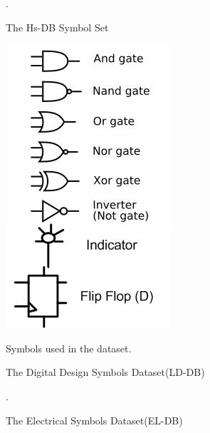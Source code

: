 \documentclass[preprint,10pt,5p,twocolumn]{elsarticle}
\begin{document}
\begin{figure}
\centering 
\label{fig:symbolSet}
		\caption{The Hs-DB Symbol Set}.
\end{figure}
\begin{figure}
\centering 
\label{fig:LogicsymbolSet}
 
		\includegraphics[scale=0.5]{images/logicSet.jpg}	 
		\caption{The Digital Design Symbols Dataset(LD-DB)} Symbols used in the dataset.
\end{figure}
\begin{figure}
\centering 
\label{fig:ELsymbolSet}
		\caption{The Electrical Symbols Dataset(EL-DB)} .
\end{figure}
\end{document}
